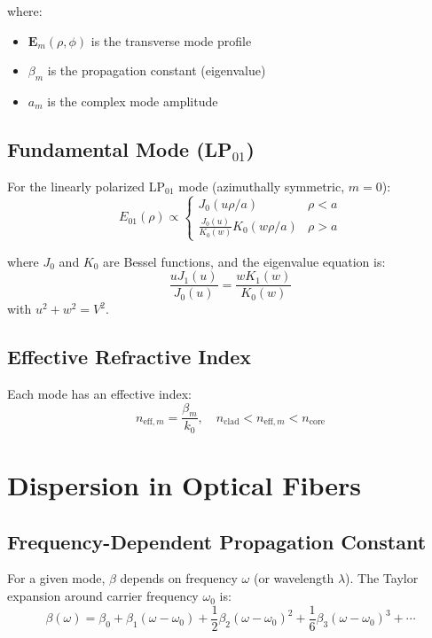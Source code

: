 \documentclass[12pt,a4paper]{article}
\begin{document}
where:
\begin{itemize}[leftmargin=*]
\item $\mathbf{E}_m(\rho, \phi)$ is the transverse mode profile
\item $\beta_m$ is the propagation constant (eigenvalue)
\item $a_m$ is the complex mode amplitude
\end{itemize}

\subsection{Fundamental Mode (LP$_{01}$)}

For the linearly polarized LP$_{01}$ mode (azimuthally symmetric, $m=0$):
\begin{equation}
E_{01}(\rho) \propto \begin{cases}
J_0(u\rho/a) & \rho < a\\
\frac{J_0(u)}{K_0(w)} K_0(w\rho/a) & \rho > a
\end{cases} \label{eq:LP01}
\end{equation}

where $J_0$ and $K_0$ are Bessel functions, and the eigenvalue equation is:
\begin{equation}
\frac{u J_1(u)}{J_0(u)} = \frac{w K_1(w)}{K_0(w)}
\end{equation}
with $u^2 + w^2 = V^2$.

\subsection{Effective Refractive Index}

Each mode has an effective index:
\begin{equation}
n_{\text{eff},m} = \frac{\beta_m}{k_0}, \quad n_{\text{clad}} < n_{\text{eff},m} < n_{\text{core}}
\end{equation}

\section{Dispersion in Optical Fibers}

\subsection{Frequency-Dependent Propagation Constant}

For a given mode, $\beta$ depends on frequency $\omega$ (or wavelength $\lambda$). The Taylor expansion around carrier frequency $\omega_0$ is:
\begin{equation}
\beta(\omega) = \beta_0 + \beta_1(\omega - \omega_0) + \frac{1}{2}\beta_2(\omega - \omega_0)^2 + \frac{1}{6}\beta_3(\omega - \omega_0)^3 + \cdots \label{eq:beta_expansion}
\end{equation}
\end{document}
